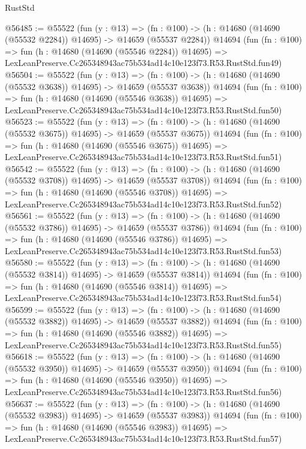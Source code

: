\begin{lexlean}{RustStd}
\begin{coremodule}
@56485 := @55522
    (fun (y : @13) =>
    (fn : @100) -> (h : @14680 (@14690 (@55532 @2284)) @14695) -> @14659 (@55537 @2284))
    @14694
    (fun (fn : @100) =>
    fun (h : @14680 (@14690 (@55546 @2284)) @14695) =>
    LexLeanPreserve.Cc265348943ac75b534ad14c10e123f73.R53.RustStd.fun49)
@56504 := @55522
    (fun (y : @13) =>
    (fn : @100) -> (h : @14680 (@14690 (@55532 @3638)) @14695) -> @14659 (@55537 @3638))
    @14694
    (fun (fn : @100) =>
    fun (h : @14680 (@14690 (@55546 @3638)) @14695) =>
    LexLeanPreserve.Cc265348943ac75b534ad14c10e123f73.R53.RustStd.fun50)
@56523 := @55522
    (fun (y : @13) =>
    (fn : @100) -> (h : @14680 (@14690 (@55532 @3675)) @14695) -> @14659 (@55537 @3675))
    @14694
    (fun (fn : @100) =>
    fun (h : @14680 (@14690 (@55546 @3675)) @14695) =>
    LexLeanPreserve.Cc265348943ac75b534ad14c10e123f73.R53.RustStd.fun51)
@56542 := @55522
    (fun (y : @13) =>
    (fn : @100) -> (h : @14680 (@14690 (@55532 @3708)) @14695) -> @14659 (@55537 @3708))
    @14694
    (fun (fn : @100) =>
    fun (h : @14680 (@14690 (@55546 @3708)) @14695) =>
    LexLeanPreserve.Cc265348943ac75b534ad14c10e123f73.R53.RustStd.fun52)
@56561 := @55522
    (fun (y : @13) =>
    (fn : @100) -> (h : @14680 (@14690 (@55532 @3786)) @14695) -> @14659 (@55537 @3786))
    @14694
    (fun (fn : @100) =>
    fun (h : @14680 (@14690 (@55546 @3786)) @14695) =>
    LexLeanPreserve.Cc265348943ac75b534ad14c10e123f73.R53.RustStd.fun53)
@56580 := @55522
    (fun (y : @13) =>
    (fn : @100) -> (h : @14680 (@14690 (@55532 @3814)) @14695) -> @14659 (@55537 @3814))
    @14694
    (fun (fn : @100) =>
    fun (h : @14680 (@14690 (@55546 @3814)) @14695) =>
    LexLeanPreserve.Cc265348943ac75b534ad14c10e123f73.R53.RustStd.fun54)
@56599 := @55522
    (fun (y : @13) =>
    (fn : @100) -> (h : @14680 (@14690 (@55532 @3882)) @14695) -> @14659 (@55537 @3882))
    @14694
    (fun (fn : @100) =>
    fun (h : @14680 (@14690 (@55546 @3882)) @14695) =>
    LexLeanPreserve.Cc265348943ac75b534ad14c10e123f73.R53.RustStd.fun55)
@56618 := @55522
    (fun (y : @13) =>
    (fn : @100) -> (h : @14680 (@14690 (@55532 @3950)) @14695) -> @14659 (@55537 @3950))
    @14694
    (fun (fn : @100) =>
    fun (h : @14680 (@14690 (@55546 @3950)) @14695) =>
    LexLeanPreserve.Cc265348943ac75b534ad14c10e123f73.R53.RustStd.fun56)
@56637 := @55522
    (fun (y : @13) =>
    (fn : @100) -> (h : @14680 (@14690 (@55532 @3983)) @14695) -> @14659 (@55537 @3983))
    @14694
    (fun (fn : @100) =>
    fun (h : @14680 (@14690 (@55546 @3983)) @14695) =>
    LexLeanPreserve.Cc265348943ac75b534ad14c10e123f73.R53.RustStd.fun57)

\end{coremodule}
\end{lexlean}
